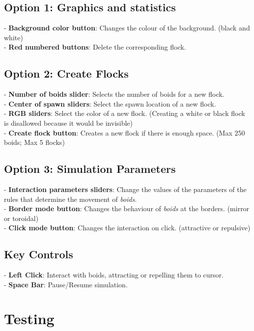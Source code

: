 \documentclass[10pt,a4paper]{article}
\begin{document}
\subsection{Option 1: Graphics and statistics} 

- \textbf{Background color button}: Changes the colour of the background. (black and white) \\
- \textbf{Red numbered buttons}: Delete the corresponding flock.

\subsection{Option 2: Create Flocks}

- \textbf{Number of boids slider}: Selects the number of boids for a new flock. \\
- \textbf{Center of spawn sliders}: Select the spawn location of a new flock. \\
- \textbf{RGB sliders}: Select the color of a new flock. (Creating a white or black flock is disallowed because it would be invisible) \\
- \textbf{Create flock button}: Creates a new flock if there is enough space. (Max 250 boids; Max 5 flocks)

\subsection{Option 3: Simulation Parameters}

- \textbf{Interaction parameters sliders}: Change the values of the parameters of the rules that determine the movement of \textit{boids}. \\
- \textbf{Border mode button}: Changes the behaviour of \textit{boids} at the borders. (mirror or toroidal) \\
- \textbf{Click mode button}: Changes the interaction on click. (attractive or repulsive)

\subsection{Key Controls}

- \textbf{Left Click}: Interact with boids, attracting or repelling them to cursor. \\
- \textbf{Space Bar}: Pause/Resume simulation.

\newpage

\section{Testing}
\end{document}
